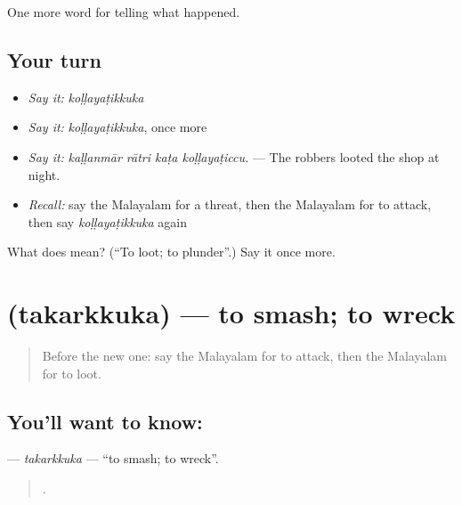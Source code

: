 \begin{grammarlens}[title={What you've built}]
One more word for telling what happened.
\end{grammarlens}

\subsection*{Your turn}
\begin{itemize}
\raggedright
  \item \emph{Say it:} \emph{koḷḷayaṭikkuka}
  \item \emph{Say it:} \emph{koḷḷayaṭikkuka}, once more
  \item \emph{Say it:} \emph{kaḷḷanmār rātri kaṭa koḷḷayaṭiccu.} — The robbers looted the shop at night.
  \item \emph{Recall:} say the Malayalam for a threat, then the Malayalam for to attack, then say \emph{koḷḷayaṭikkuka} again
\end{itemize}

\begin{tcolorbox}[breakable,colback=teal!4,colframe=teal!35!black,title={Before you move on}]
What does  mean? (\textquotedblleft{}To loot; to plunder\textquotedblright{}.) Say it once more.
\end{tcolorbox}
\section[\texorpdfstring{\ml{തകർക്കുക} (takarkkuka)}{തകർക്കുക (takarkkuka)}]{ (takarkkuka) — to smash; to wreck}

\label{lesson:ML-C373-takarkkuka}



\begin{quote}
Before the new one: say the Malayalam for to attack, then the Malayalam for to loot.
\end{quote}

\subsection*{You'll want to know: }
\textbf{} — \emph{takarkkuka} — \textquotedblleft{}to smash; to wreck\textquotedblright{}.

\begin{quote}
   .
\end{quote}

